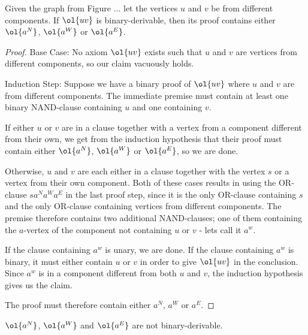 \begin{lemma}
  Given the graph from Figure ... let the vertices $u$ and $v$ be from different components.
  If $\ol{uv}$ is binary-derivable, then its proof contains either $\ol{a^N}$, $\ol{a^W}$ or $\ol{a^E}$.
  \label{thm:uv_proof_contains_a}
\end{lemma}

\begin{proof}
  Base Case:
  No axiom $\ol{uv}$ exists such that $u$ and $v$ are vertices from different components, so our claim vacuously holds.

  Induction Step:
  Suppose we have a binary proof of $\ol{uv}$ where $u$ and $v$ are from different components.
  The immediate premise must contain at least one binary NAND-clause containing $u$ and one containing $v$.
  \begin{figure}[!h]
    \centering
    \begin{prooftree*}
      \Hypo{\dots}
    \end{prooftree*}
    \caption{}
    \label{fig:proof_scheme_uv}
  \end{figure}
  If either $u$ or $v$ are in a clause together with a vertex from a component different from their own, we get from the induction hypothesis that their proof must contain either $\ol{a^N}$, $\ol{a^W}$ or $\ol{a^E}$, so we are done.

  Otherwise, $u$ and $v$ are each either in a clause together with the vertex $s$ or a vertex from their own component.
  Both of these cases results in using the OR-clause $sa^Na^Wa^E$ in the last proof step, since it is the only OR-clause containing $s$ and the only OR-clause containing vertices from different components.
  The premise therefore contains two additional NAND-clauses; one of them containing the $a$-vertex of the component not containing $u$ or $v$ - lets call it $a^w$.

  If the clause containing $a^w$ is unary, we are done.
  If the clause containing $a^w$ is binary, it must either contain $u$ or $v$ in order to give $\ol{uv}$ in the conclusion.
  Since $a^w$ is in a component different from both $u$ and $v$, the induction hypothesis gives us the claim.

  The proof must therefore contain either $a^N$, $a^W$ or $a^E$.
\end{proof}

\begin{lemma}
  $\ol{a^N}$, $\ol{a^W}$ and $\ol{a^E}$ are not binary-derivable.
  \label{thm:non_binary_derivable_a}
\end{lemma}

